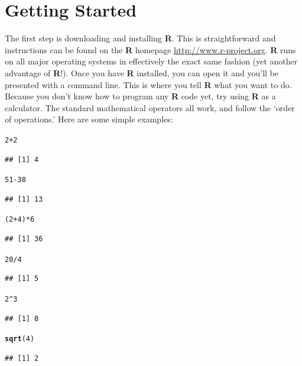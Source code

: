 \documentclass[12pt]{article}\usepackage[]{graphicx}\usepackage[]{color}
\makeatletter
\newcommand{\hlnum}[1]{\textcolor[rgb]{0.686,0.059,0.569}{#1}}%
\newcommand{\hlopt}[1]{\textcolor[rgb]{0,0,0}{#1}}%
\newcommand{\hlstd}[1]{\textcolor[rgb]{0.345,0.345,0.345}{#1}}%
\newcommand{\hlkwd}[1]{\textcolor[rgb]{0.737,0.353,0.396}{\textbf{#1}}}%
\newenvironment{kframe}{%
 \def\at@end@of@kframe{}%
 \ifinner\ifhmode%
  \def\at@end@of@kframe{\end{minipage}}%
  \begin{minipage}{\columnwidth}%
 \fi\fi%
 \def\FrameCommand##1{\hskip\@totalleftmargin \hskip-\fboxsep
 \colorbox{shadecolor}{##1}\hskip-\fboxsep
     \hskip-\linewidth \hskip-\@totalleftmargin \hskip\columnwidth}%
 \MakeFramed {\advance\hsize-\width
   \@totalleftmargin\z@ \linewidth\hsize
   \@setminipage}}%
 {\par\unskip\endMakeFramed%
 \at@end@of@kframe}
\newenvironment{knitrout}{}{} %
\makeatother
\begin{document}
\section{Getting Started}
The first step is downloading and installing \textbf{R}. This is straightforward and instructions can be found on the \textbf{R} homepage \url{http://www.r-project.org}. \textbf{R} runs on all major operating systems in effectively the exact same fashion (yet another advantage of \textbf{R}!). Once you have \textbf{R} installed, you can open it and you'll be presented with a command line. This is where you tell \textbf{R} what you want to do. Because you don't know how to program any \textbf{R} code yet, try using \textbf{R} as a calculator. The standard mathematical operators all work, and follow the `order of operations.' Here are some simple examples: 
\begin{knitrout}
\color{fgcolor}\begin{kframe}
\begin{alltt}
\hlnum{2} \hlopt{+} \hlnum{2}
\end{alltt}
\begin{verbatim}
## [1] 4
\end{verbatim}
\begin{alltt}
\hlnum{51} \hlopt{-} \hlnum{38}
\end{alltt}
\begin{verbatim}
## [1] 13
\end{verbatim}
\begin{alltt}
\hlstd{(}\hlnum{2} \hlopt{+} \hlnum{4}\hlstd{)} \hlopt{*} \hlnum{6}
\end{alltt}
\begin{verbatim}
## [1] 36
\end{verbatim}
\begin{alltt}
\hlnum{20}\hlopt{/}\hlnum{4}
\end{alltt}
\begin{verbatim}
## [1] 5
\end{verbatim}
\begin{alltt}
\hlnum{2}\hlopt{^}\hlnum{3}
\end{alltt}
\begin{verbatim}
## [1] 8
\end{verbatim}
\begin{alltt}
\hlkwd{sqrt}\hlstd{(}\hlnum{4}\hlstd{)}
\end{alltt}
\begin{verbatim}
## [1] 2
\end{verbatim}
\end{kframe}
\end{knitrout}
\end{document}
